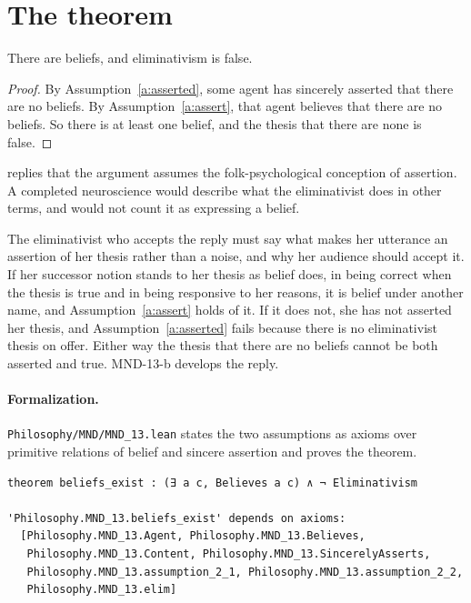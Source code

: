 \documentclass{situationist-preprint}
\begin{document}
\section{The theorem}

\begin{theorem}\label{t:main}
There are beliefs, and eliminativism is false.
\end{theorem}

\begin{proof}
By Assumption~\ref{a:asserted}, some agent has sincerely asserted that there are no beliefs. By Assumption~\ref{a:assert}, that agent believes that there are no beliefs. So there is at least one belief, and the thesis that there are none is false.
\end{proof}

\begin{objection}
\citet{Churchland1981} replies that the argument assumes the folk-psychological conception of assertion. A completed neuroscience would describe what the eliminativist does in other terms, and would not count it as expressing a belief.
\end{objection}

\begin{reply}
The eliminativist who accepts the reply must say what makes her utterance an assertion of her thesis rather than a noise, and why her audience should accept it. If her successor notion stands to her thesis as belief does, in being correct when the thesis is true and in being responsive to her reasons, it is belief under another name, and Assumption~\ref{a:assert} holds of it. If it does not, she has not asserted her thesis, and Assumption~\ref{a:asserted} fails because there is no eliminativist thesis on offer. Either way the thesis that there are no beliefs cannot be both asserted and true. MND-13-b develops the reply.
\end{reply}

\paragraph{Formalization.} \nolinkurl{Philosophy/MND/MND_13.lean} states the two assumptions as axioms over primitive relations of belief and sincere assertion and proves the theorem.

\begin{lstlisting}
theorem beliefs_exist : (∃ a c, Believes a c) ∧ ¬ Eliminativism

'Philosophy.MND_13.beliefs_exist' depends on axioms:
  [Philosophy.MND_13.Agent, Philosophy.MND_13.Believes,
   Philosophy.MND_13.Content, Philosophy.MND_13.SincerelyAsserts,
   Philosophy.MND_13.assumption_2_1, Philosophy.MND_13.assumption_2_2,
   Philosophy.MND_13.elim]
\end{lstlisting}
\end{document}
